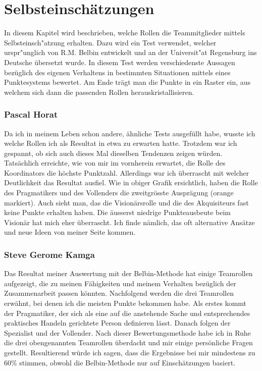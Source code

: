 \chapter{Selbsteinschätzungen}
In diesem Kapitel wird beschrieben, welche Rollen die Teammitglieder mittels Selbsteinsch"atzung erhalten. Dazu wird ein Test verwendet, welcher urspr"unglich von R.M. Belbin \cite{belbin1981management} entwickelt und an der Universit"at Regensburg ins Deutsche übersetzt wurde\cite{Studienbrief}. In diesem Test werden verschiedenste Aussagen bezüglich des eigenen Verhaltens in bestimmten Situationen mittels eines Punktesystems bewertet. Am Ende trägt man die Punkte in ein Raster ein, aus welchem sich dann die passenden Rollen herauskristallisieren.

\subsection*{Pascal Horat}
Da ich in meinem Leben schon andere, ähnliche Tests ausgefüllt habe, wusste ich welche Rollen ich als Resultat in etwa zu erwarten hatte. Trotzdem war ich gespannt, ob sich auch dieses Mal dieselben Tendenzen zeigen würden. \\

Tatsächlich erreichte, wie von mir im vornherein erwartet, die Rolle des Koordinators die höchste Punktzahl. Allerdings war ich überrascht mit welcher Deutlichkeit das Resultat ausfiel. Wie in obiger Grafik ersichtlich, haben die Rolle des Pragmatikers und des Vollenders die zweitgrösste Ausprägung (orange markiert). Auch sieht man, das die Visionärsrolle und die des Akquisiteurs fast keine Punkte erhalten haben. Die äusserst niedrige Punkteausbeute beim Visionär hat mich eher überrascht. Ich finde nämlich, das oft alternative Ansätze und neue Ideen von meiner Seite kommen.

\subsection*{Steve Gerome Kamga}
Das Resultat meiner Auswertung mit der Belbin-Methode hat einige Teamrollen aufgezeigt, die zu meinen Fähigkeiten und meinem Verhalten bezüglich der Zusammenarbeit passen könnten. Nachfolgend werden die drei Teamrollen erwähnt, bei denen ich die meisten Punkte bekommen habe.
Als erstes kommt der Pragmatiker, der sich als eine auf die anstehende Sache und entsprechendes praktisches Handeln gerichtete Person definieren lässt. Danach folgen der Spezialist und der Vollender.
\newline
Nach dieser Bewertungsmethode habe ich in Ruhe die drei obengenannten Teamrollen überdacht und mir einige persönliche Fragen gestellt. Resultierend würde ich sagen, dass die Ergebnisse bei mir mindestens zu 60\% stimmen, obwohl die Belbin-Methode nur auf Einschätzungen basiert.


